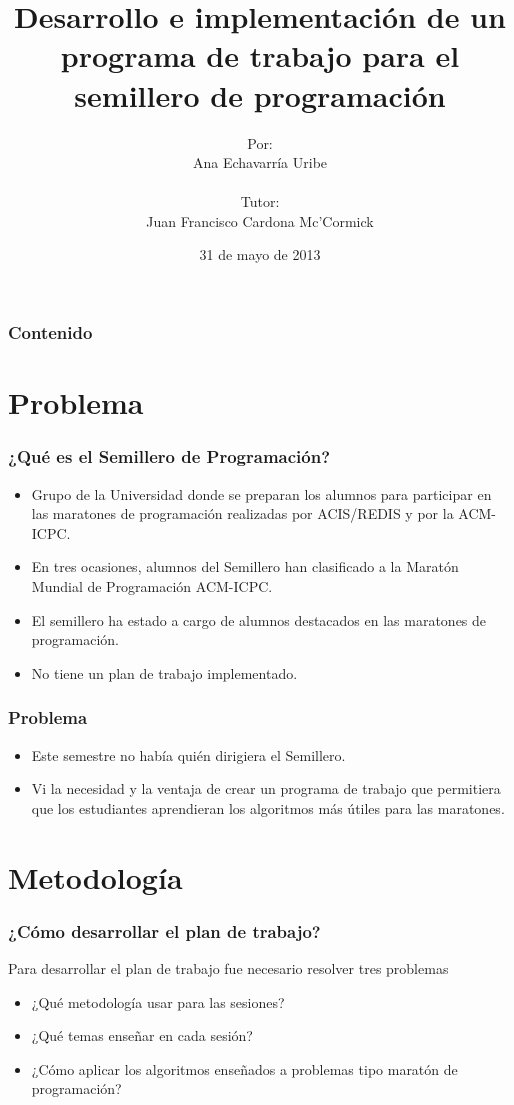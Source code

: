\documentclass{beamer}
\title{Desarrollo e implementación de un programa de trabajo para el semillero de programación}
\author{Por: \\ Ana Echavarría Uribe \\ \quad \\ Tutor: \\ Juan Francisco Cardona Mc'Cormick}
\institute{Universidad EAFIT}
\date{31 de mayo de 2013}
\begin{document}
\begin{frame}
	\titlepage
\end{frame}

\begin{frame}
	\frametitle{Contenido}
	\tableofcontents
\end{frame}

\section{Problema}
	\begin{frame}
		\frametitle{¿Qué es el Semillero de Programación?}
		\begin{itemize}
			\item Grupo de la Universidad donde se preparan los alumnos para participar en las maratones de programación realizadas por ACIS/REDIS y por la ACM-ICPC.
			\item En tres ocasiones, alumnos del Semillero han clasificado a la Maratón Mundial de Programación ACM-ICPC.
			\item El semillero ha estado a cargo de alumnos destacados en las maratones de programación.
			\item No tiene un plan de trabajo implementado.
		\end{itemize}		
	\end{frame}
	
	\begin{frame}
		\frametitle{Problema}
		\begin{itemize}
			\item Este semestre no había quién dirigiera el Semillero.
			\item Vi la necesidad y la ventaja de crear un programa de trabajo que permitiera que los estudiantes aprendieran los algoritmos más útiles para las maratones.
		\end{itemize}
	\end{frame}
	
\section{Metodología}
	
	\begin{frame}
		\frametitle{¿Cómo desarrollar el plan de trabajo?}
		Para desarrollar el plan de trabajo fue necesario resolver tres problemas
		\begin{itemize}
			\item ¿Qué metodología usar para las sesiones?
			\item ¿Qué temas enseñar en cada sesión?
			\item ¿Cómo aplicar los algoritmos enseñados a problemas tipo maratón de programación?
		\end{itemize}
	\end{frame}
\end{document}
